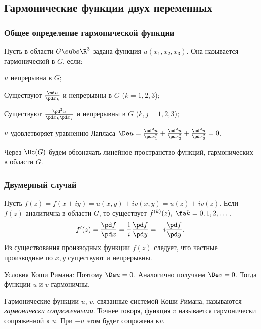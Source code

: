 \documentclass[a4paper]{article}
\begin{document}
\begin{theorem}
\subsection{Гармонические функции двух переменных}

\subsubsection{Общее определение гармонической функции}

Пусть в области $G\subs\R^3$ задана функция $u(x_1,x_2,x_3)$. Она называется гармонической в $G$,  если:
\begin{points}{-1}
\item $u$ непрерывна в $G$;
\item
 Существуют $\frac{\pd u}{\pd x_k}$ и непрерывны в $G$ ($k=1,2,3$);
\item
 Существуют $\frac{\pd^2u}{\pd x_k\pd x_j}$ и непрерывны в $G$ ($k,j=1,2,3$);
\item
 $u$ удовлетворяет уравнению Лапласа
 $\De u=\frac{\pd^2 u}{\pd x_1^2}+\frac{\pd^2 u}{\pd x_2^2}+\frac{\pd^2 u}{\pd x_3^2}
 =0$.
\end{points}

Через $\Hc(G)$ будем обозначать линейное пространство функций, гармонических  в области $G$.

\subsubsection{Двумерный случай}

Пусть $f(z)=f(x+iy)=u(x,y)+iv(x,y)=u(z)+iv(z)$.
Если $f(z)$ аналитична в области $G$,  то существует
$f^{(k)}(z),\;\fa k=0,1,2,\dots$.
$$
  f'(z)=\frac{\pd f}{\pd x}=\frac1i \frac{\pd f}{\pd y}=-i\frac{\pd f}{\pd y}.
$$
Из существования производных функции $f(z)$ следует, что частные производные
по $x,y$ существуют и непрерывны.

Условия Коши Римана:
Поэтому $\De u=0$. Аналогично получаем $\De v=0$. Тогда  функции $u$ и $v$ гармоничны.

\begin{df}
Гармонические функции $u$, $v$, связанные системой Коши Римана, называются \emph{гармонически сопряженными}.
Точнее говоря, функция $v$ называется гармонически сопряженной к $u$. При $-u$ этом будет сопряжена к$v$.
\end{df}


\end{theorem}
\end{document}
